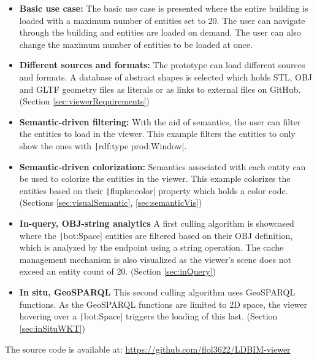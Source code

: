 \begin{itemize}
    \item \textbf{Basic use case:} The basic use case is presented where the entire building is loaded with a maximum number of entities set to 20. The user can navigate through the building and entities are loaded on demand. The user can also change the maximum number of entities to be loaded at once.
    \item \textbf{Different sources and formats:} The prototype can load different sources and formats. A database of abstract shapes is selected which holds STL, OBJ and GLTF geometry files as literals or as links to external files on GitHub. (Section \ref{sec:viewerRequirements})
    \item \textbf{Semantic-driven filtering:} With the aid of semantics, the user can filter the entities to load in the viewer. This example filters the entities to only show the ones with \texttt|rdf:type prod:Window|.
    \item \textbf{Semantic-driven colorization:} Semantics associated with each entity can be used to colorize the entities in the viewer. This example colorizes the entities based on their \texttt|flupke:color| property which holds a color code. (Sections \ref{sec:visualSemantic}, \ref{sec:semanticVis})
    \item \textbf{In-query, OBJ-string analytics} A first culling algorithm is showcased where the \texttt|bot:Space| entities are filtered based on their OBJ definition, which is analyzed by the endpoint using a string operation. The cache management mechanism is also visualized as the viewer's scene does not exceed an entity count of 20. (Section \ref{sec:inQuery})
    \item \textbf{In situ, GeoSPARQL} This second culling algorithm uses GeoSPARQL functions. As the GeoSPARQL functions are limited to 2D space, the viewer hovering over a \texttt|bot:Space| triggers the loading of this last. (Section \ref{sec:inSituWKT})
\end{itemize}

The source code is available at: \url{https://github.com/flol3622/LDBIM-viewer}
